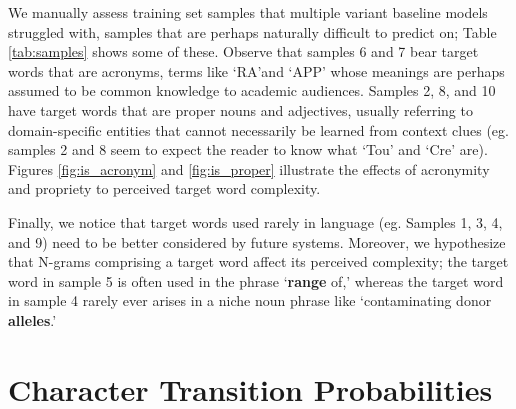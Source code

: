 \documentclass{dcthesis}
\theoremstyle{definition}
\theoremstyle{remark}
\begin{document}
We manually assess training set samples that multiple variant baseline models struggled with, samples that are perhaps naturally difficult to predict on; Table \ref{tab:samples} shows some of these. Observe that samples 6 and 7 bear target words that are acronyms, terms like \lq{RA}\rq and \lq{APP}\rq{} whose meanings are perhaps assumed to be common knowledge to academic audiences. Samples 2, 8, and 10 have target words that are proper nouns and adjectives, usually referring to domain-specific entities that cannot necessarily be learned from context clues (eg. samples 2 and 8 seem to expect the reader to know what \lq{Tou}\rq{} and \lq{Cre}\rq{} are). Figures \ref{fig:is_acronym} and \ref{fig:is_proper} illustrate the effects of acronymity and propriety to perceived target word complexity.

Finally, we notice that target words used rarely in language (eg. Samples 1, 3, 4, and 9) need to be better considered by future systems. Moreover, we hypothesize that N-grams comprising a target word affect its perceived complexity; the target word in sample 5 is often used in the phrase \lq{\textbf{range} of,}\rq{} whereas the target word in sample 4 rarely ever arises in a niche noun phrase like \lq{contaminating donor \textbf{alleles}.}\rq{} 

\section{Character Transition Probabilities}
\end{document}
